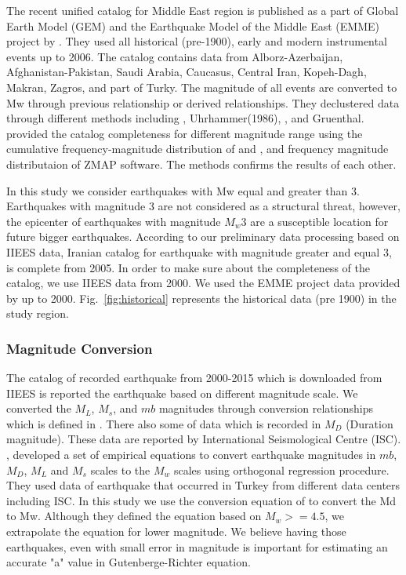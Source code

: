 The recent unified catalog for Middle East region is published as a part of Global Earth Model (GEM) and the Earthquake Model of the Middle East (EMME) project by \citet{Zare2014}. They used all historical (pre-1900), early and modern instrumental events up to 2006. The catalog contains data from Alborz-Azerbaijan, Afghanistan-Pakistan, Saudi Arabia, Caucasus, Central Iran, Kopeh-Dagh, Makran, Zagros, and part of Turky. The magnitude of all events are converted to Mw through previous relationship or derived relationships. They declustered data through different methods including \citet{Gardner1974}, Uhrhammer(1986), \citet{Reasenberg1985}, and Gruenthal. \citet{Zare2014} provided the catalog completeness for different magnitude range using  the cumulative frequency-magnitude distribution of  \citet{Gutenberg1944} and \citet{richter1958}, and frequency magnitude distributaion of ZMAP \citep{Wiemer2001} software. The methods confirms the results of each other. 

In this study we consider earthquakes with Mw equal and greater than 3. Earthquakes with magnitude 3 are not considered as a structural threat, however, the epicenter of earthquakes with magnitude $M_w 3$ are a  susceptible location for future bigger earthquakes.  According to our preliminary data processing based on IIEES data, Iranian catalog for earthquake with magnitude greater and equal 3, is complete from 2005. In order to make sure about the completeness of the catalog, we use IIEES data from 2000. We used the EMME project data provided by \citet{Zare2014} up to 2000. Fig.~\ref{fig:historical} represents the historical data (pre 1900) in the study region. 

\subsubsection{Magnitude Conversion}

The catalog of recorded earthquake from 2000-2015 which is downloaded from IIEES is reported the earthquake based on different magnitude scale. We converted the $M_L$, $M_s$, and $mb$ magnitudes through conversion relationships which is defined in \citet{Zare2014}. There also some of data which is recorded in $M_D$ (Duration magnitude). These data are reported by International Seismological Centre (ISC).  \citet{Deniz2010}, developed a set of empirical equations to convert earthquake magnitudes in $mb$, $M_D$, $M_L$ and $M_s$ scales to the $M_w$ scales using orthogonal regression procedure. They used data of earthquake that occurred in Turkey from different data centers including ISC. In this study we use the conversion equation of \citet{Deniz2010} to convert the Md to Mw. Although they defined the equation based on $M_w>=4.5$, we extrapolate the equation for lower magnitude. We believe having those earthquakes, even with small error  in magnitude is important for estimating an accurate "a" value  in Gutenberge-Richter equation.

